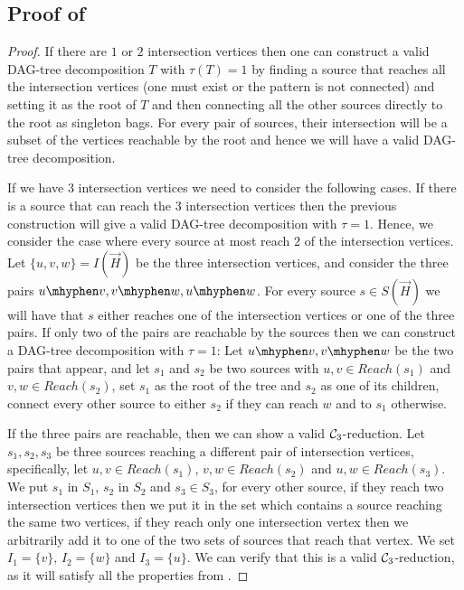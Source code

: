 \documentclass[a4paper,UKenglish,cleveref, autoref, numberwithinsect, thm-restate]{lipics-v2021}
\newcommand{\cycle}[1]{\cC_{#1}}
\newcommand{\Reachable}{Reach}
\newcommand{\dtw}{\tau}
\newcommand{\dagtree}{DAG-tree decomposition}
\newcommand{\cC}{{\cal C}}
\begin{document}
	\subsection{Proof of }
	\threeintersections*
	\begin{proof}
		If there are $1$ or $2$ intersection vertices then one can construct a valid \dagtree{} $T$ with $\dtw(T)=1$ by finding a source that reaches all the intersection vertices (one must exist or the pattern is not connected) and setting it as the root of $T$ and then connecting all the other sources directly to the root as singleton bags. For every pair of sources, their intersection will be a subset of the vertices reachable by the root and hence we will have a valid \dagtree{}.
		
		If we have $3$ intersection vertices we need to consider the following cases. If there is a source that can reach the $3$ intersection vertices then the previous construction will give a valid \dagtree{} with $\dtw=1$. Hence, we consider the case where every source at most reach $2$ of the intersection vertices. Let $\{u,v,w\} = I(\vec{H})$ be the three intersection vertices, and consider the three pairs $u\mhyphen v,v\mhyphen w,u\mhyphen w$. For every source $s \in S(\vec{H})$ we will have that $s$ either reaches one of the intersection vertices or one of the three pairs. If only two of the pairs are reachable by the sources then we can construct a \dagtree{} with $\dtw=1$: Let $u\mhyphen v,v\mhyphen w$ be the two pairs that appear, and let $s_1$ and $s_2$ be two sources with $u,v \in \Reachable(s_1)$ and $v,w \in \Reachable(s_2)$, set $s_1$ as the root of the tree and $s_2$ as one of its children, connect every other source to either $s_2$ if they can reach $w$ and to $s_1$ otherwise.
		
		If the three pairs are reachable, then we can show a valid $\cycle{3}$-reduction. Let $s_1,s_2,s_3$ be three sources reaching a different pair of intersection vertices, specifically, let $u,v \in \Reachable(s_1)$, $v,w \in \Reachable(s_2)$ and $u,w \in \Reachable(s_3)$. We put $s_1$ in $S_1$, $s_2$ in $S_2$ and $s_3 \in S_3$, for every other source, if they reach two intersection vertices then we put it in the set which contains a source reaching the same two vertices, if they reach only one intersection vertex then we arbitrarily add it to one of the two sets of sources that reach that vertex. We set $I_1=\{v\}$, $I_2=\{w\}$ and $I_3=\{u\}$. We can verify that this is a valid $\cycle{3}$-reduction, as it will satisfy all the properties from .
	\end{proof}
\end{document}
